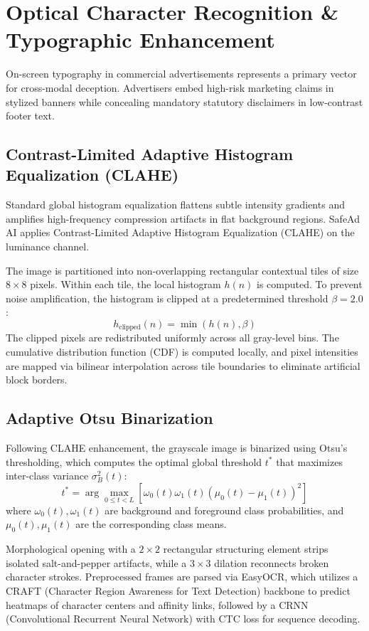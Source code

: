 \documentclass[12pt,a4paper]{report}
\begin{document}
\section{Optical Character Recognition \& Typographic Enhancement}

On-screen typography in commercial advertisements represents a primary vector for cross-modal deception. Advertisers embed high-risk marketing claims in stylized banners while concealing mandatory statutory disclaimers in low-contrast footer text.

\subsection{Contrast-Limited Adaptive Histogram Equalization (CLAHE)}
Standard global histogram equalization flattens subtle intensity gradients and amplifies high-frequency compression artifacts in flat background regions. SafeAd AI applies Contrast-Limited Adaptive Histogram Equalization (CLAHE) on the luminance channel.

The image is partitioned into non-overlapping rectangular contextual tiles of size $8 \times 8$ pixels. Within each tile, the local histogram $h(n)$ is computed. To prevent noise amplification, the histogram is clipped at a predetermined threshold $\beta = 2.0$:
\begin{equation}
h_{\text{clipped}}(n) = \min(h(n), \beta)
\end{equation}
The clipped pixels are redistributed uniformly across all gray-level bins. The cumulative distribution function (CDF) is computed locally, and pixel intensities are mapped via bilinear interpolation across tile boundaries to eliminate artificial block borders.

\subsection{Adaptive Otsu Binarization}
Following CLAHE enhancement, the grayscale image is binarized using Otsu's thresholding, which computes the optimal global threshold $t^*$ that maximizes inter-class variance $\sigma_B^2(t)$:
\begin{equation}
t^* = \arg\max_{0 \le t < L} \left[ \omega_0(t) \omega_1(t) (\mu_0(t) - \mu_1(t))^2 \right]
\end{equation}
where $\omega_0(t), \omega_1(t)$ are background and foreground class probabilities, and $\mu_0(t), \mu_1(t)$ are the corresponding class means.

Morphological opening with a $2 \times 2$ rectangular structuring element strips isolated salt-and-pepper artifacts, while a $3 \times 3$ dilation reconnects broken character strokes. Preprocessed frames are parsed via EasyOCR, which utilizes a CRAFT (Character Region Awareness for Text Detection) backbone to predict heatmaps of character centers and affinity links, followed by a CRNN (Convolutional Recurrent Neural Network) with CTC loss for sequence decoding.
\end{document}
